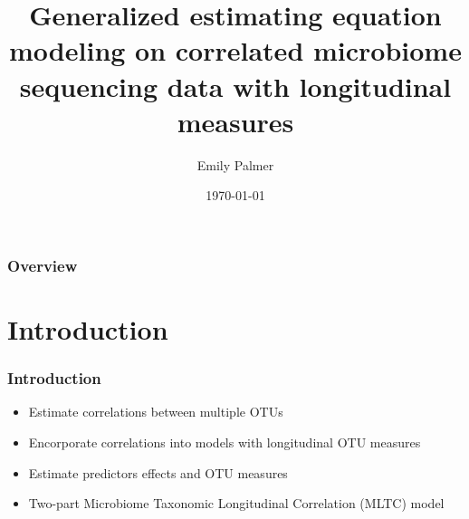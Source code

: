 \documentclass{beamer}
\title[Short title]{Generalized estimating equation modeling on correlated microbiome sequencing data with longitudinal measures} %
\author{Emily Palmer} %
\institute[OSU] %
{
Journal Club, Oregon State University  %
}
\date{\today} %
\begin{document}
\begin{frame}
\titlepage %
\end{frame}

\begin{frame}
\frametitle{Overview} %
\tableofcontents %
\end{frame}


\section{Introduction} %


\begin{frame}
\frametitle{Introduction}
\begin{itemize}
  \item Estimate correlations between multiple OTUs
  \item Encorporate correlations into models with longitudinal OTU measures
  \item Estimate predictors effects and OTU measures
  \item Two-part Microbiome Taxonomic Longitudinal Correlation (MLTC) model
\end{itemize}
\end{frame}
\end{document}
